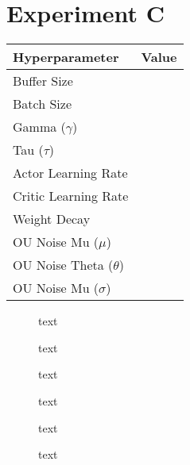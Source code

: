 \section{Experiment C}

\begin{minipage}{0.45\textwidth}
	\centering
	\begin{tabular}{lr}
	\toprule
	\textbf{Hyperparameter} & \textbf{Value} \\
	\midrule
	Buffer Size & \\
	Batch Size & \\
	Gamma ($\gamma$) & \\
	Tau ($\tau$) & \\
	Actor Learning Rate & \\
	Critic Learning Rate & \\
	Weight Decay & \\
	OU Noise Mu ($\mu$) & \\
	OU Noise Theta ($\theta$) & \\
	OU Noise Mu ($\sigma$) & \\
	\bottomrule
	\end{tabular}
\end{minipage}
\hspace{1cm}
\begin{minipage}{0.45\textwidth}
	\centering
\end{minipage}

\begin{figure}[h]
	\begin{minipage}{0.45\textwidth}
		\centering
		
		\caption{text}
		\label{fig:5301_raw_reward}
	\end{minipage}
	\hspace{0.75cm}
	\begin{minipage}{0.45\textwidth}
		\centering
		
		\caption{text}
		\label{fig:5302_average_reward}
	\end{minipage}
\end{figure}

\begin{figure}[h]
	\begin{minipage}{0.45\textwidth}
		\centering
		\caption{text}
		\label{key}
	\end{minipage}
	\hspace{1cm}
	\begin{minipage}{0.45\textwidth}
		\centering
		\caption{text}
		\label{key}
	\end{minipage}
\end{figure}

\begin{figure}[h]
	\begin{minipage}{0.45\textwidth}
		\centering
		\caption{text}
		\label{key}
	\end{minipage}
	\hspace{1cm}
	\begin{minipage}{0.45\textwidth}
		\centering
		\caption{text}
		\label{key}
	\end{minipage}
\end{figure}